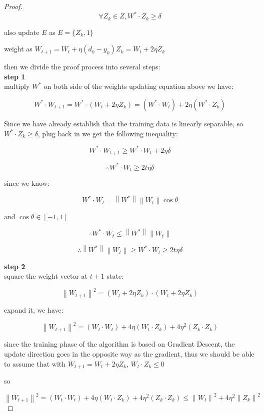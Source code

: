 \documentclass[11pt]{article}
\begin{document}
\begin{proof}
$$\forall Z_k \in Z, W^* \cdot Z_k \ge \delta$$

also update $E$ as $E = \{ Z_k, 1 \}$

weight as $W_{t+1} = W_t + \eta (d_k - y_k) Z_k = W_t + 2 \eta Z_k$

then we divide the proof process into several steps:\\

\textbf{step 1}\\

multiply $W^*$ on both side of the weights updating equation above we have:


$$W^* \cdot W_{t+1} = W^* \cdot (W_t + 2 \eta Z_k) = (W^* \cdot W_t) + 2 \eta(W^* \cdot Z_k)$$

Since we have already establish that the training data is linearly separable, so
$W^* \cdot Z_k \ge \delta$, plug back in we get the following inequality:

$$W^* \cdot W_{t+1} \ge W^* \cdot W_t + 2 \eta \delta$$


$$\therefore W^* \cdot W_t \ge 2t \eta \delta$$


since we know:

$$W^* \cdot W_t = \left \| W^*\right \| \left \| W_t\right \| \cos \theta$$


and $\cos \theta \in [-1, 1]$


$$\therefore  W^* \cdot W_t \le \left \| W^*\right \| \left \| W_t\right \|  $$


$$\therefore \left \| W^*\right \| \left \| W_t\right \| \ge W^* \cdot W_t \ge 2t \eta \delta$$



\textbf{step 2}\\

square the weight vector at $t+1$ state:

$$\left \|  W _{t+1} \right \|^2 = (W_t + 2 \eta Z_k) \cdot (W_t + 2 \eta Z_k)$$

expand it, we have:

$$\left \|  W_{t+1} \right \|^2 = (W_t \cdot W_t) + 4 \eta(W_t \cdot Z_k) + 4 \eta^2(Z_k \cdot Z_k)$$


since the training phase of the algorithm is based on Gradient Descent, the update direction goes in the opposite way as the gradient, thus we should be able to assume that with $W_{t+1} = W_t + 2 \eta Z_k$, $W_t \cdot Z_k \le 0$

so 

$$\left \|  W_{t+1} \right \|^2 = (W_t \cdot W_t) + 4 \eta(W_t \cdot Z_k) + 4 \eta^2(Z_k \cdot Z_k) \le \left \|  W_t \right \|^2 + 4 \eta^2 \left \|  Z_k \right \|^2$$


\end{proof}
\end{document}
